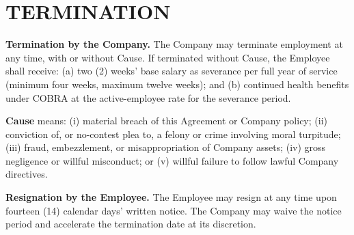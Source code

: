 \section{TERMINATION}

\parsp
\textbf{Termination by the Company.} The Company may terminate employment at any time, with or without Cause. If terminated without Cause, the Employee shall receive: (a) two (2) weeks' base salary as severance per full year of service (minimum four weeks, maximum twelve weeks); and (b) continued health benefits under COBRA at the active-employee rate for the severance period.

\parsp
\textbf{Cause} means: (i) material breach of this Agreement or Company policy; (ii) conviction of, or no-contest plea to, a felony or crime involving moral turpitude; (iii) fraud, embezzlement, or misappropriation of Company assets; (iv) gross negligence or willful misconduct; or (v) willful failure to follow lawful Company directives.

\parsp
\textbf{Resignation by the Employee.} The Employee may resign at any time upon fourteen (14) calendar days' written notice. The Company may waive the notice period and accelerate the termination date at its discretion.

